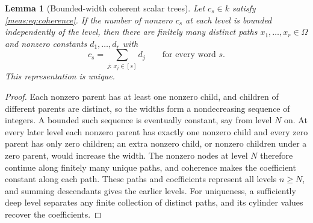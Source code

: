 \documentclass[11pt]{article}
\numberwithin{equation}{section}
\newtheorem{lemma}[theorem]{Lemma}
\theoremstyle{definition}
\theoremstyle{remark}
\begin{document}
\begin{lemma}[Bounded-width coherent scalar trees]\label{meas:lem:tree}
Let $c_s\in k$ satisfy \eqref{meas:eq:coherence}. If the number of nonzero $c_s$
at each level is bounded independently of the level, then there are finitely
many distinct paths $x_1,\ldots,x_r\in\Omega$ and nonzero constants
$d_1,\ldots,d_r$ with
\begin{equation}\label{meas:eq:tree-atoms}
 c_s=\sum_{j:\,x_j\in[s]}d_j\qquad\text{for every word }s.
\end{equation}
This representation is unique.
\end{lemma}
\begin{proof}
Each nonzero parent has at least one nonzero child, and children of different
parents are distinct, so the widths form a nondecreasing sequence of integers.
A bounded such sequence is eventually constant, say from level $N$ on. At
every later level each nonzero parent has exactly one nonzero child and every
zero parent has only zero children; an extra nonzero child, or nonzero
children under a zero parent, would increase the width. The nonzero nodes at
level $N$ therefore continue along finitely many unique paths, and coherence
makes the coefficient constant along each path. These paths and coefficients
represent all levels $n\ge N$, and summing descendants gives the earlier
levels. For uniqueness, a sufficiently deep level separates any finite
collection of distinct paths, and its cylinder values recover the
coefficients.
\end{proof}
\end{document}
